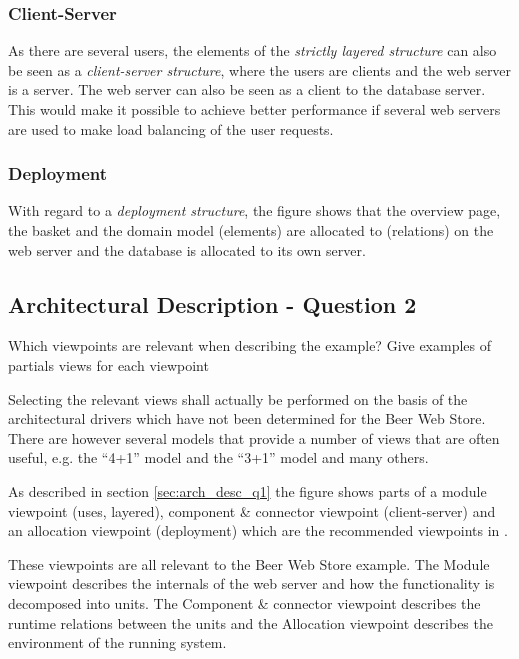 \subsubsection{Client-Server}

As there are several users, the elements of the
\emph{strictly layered structure} can also be seen as a
\emph{client-server structure}, where the users are clients
and the web server is a server. The web server can also be
seen as a client to the database server. This would make it
possible to achieve better performance if several web servers
are used to make load balancing of the user requests.

\subsubsection{Deployment}

With regard to a \emph{deployment structure}, the figure shows
that the overview page, the basket and the domain model (elements)
are allocated to (relations) on the web server and the database is
allocated to its own server.

\subsection{Architectural Description - Question 2}

\begin{question}
Which viewpoints are relevant when describing the example?
Give examples of partials views for each viewpoint
\end{question}

Selecting the relevant views shall actually be performed on
the basis of the architectural drivers which have not been
determined for the Beer Web Store. There are however several
models that provide a number of views that are often useful,
e.g. the ``4+1'' model \cite{kruchten1995} and the ``3+1''
model \cite{christensen2004archdesc} and many others.

As described in section \ref{sec:arch_desc_q1} the figure shows
parts of a module viewpoint (uses, layered), component \&
connector viewpoint (client-server) and an allocation viewpoint
(deployment) which are the recommended viewpoints in
\cite{christensen2004archdesc}.

These viewpoints are all relevant to the Beer Web Store example.
The Module viewpoint describes the internals of the web server and how
the functionality is decomposed into units. The Component \& connector
viewpoint describes the runtime relations between the units and the
Allocation viewpoint describes the environment of the running
system.

